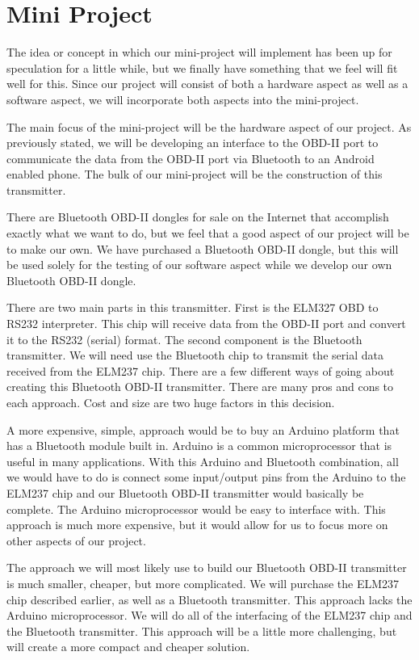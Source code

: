 \documentclass[12pt]{article}
\begin{document}
\section{Mini Project}\label{sec:MiniProject}

The idea or concept in which our mini-project will implement has been up for speculation for a little while, but we finally have something that we feel will fit well for this. Since our project will consist of both a hardware aspect as well as a software aspect, we will incorporate both aspects into the mini-project.

The main focus of the mini-project will be the hardware aspect of our project. As previously stated, we will be developing an interface to the OBD-II port to communicate the data from the OBD-II port via Bluetooth to an Android enabled phone. The bulk of our mini-project will be the construction of this transmitter.

There are Bluetooth OBD-II dongles for sale on the Internet that accomplish exactly what we want to do, but we feel that a good aspect of our project will be to make our own. We have purchased a Bluetooth OBD-II dongle, but this will be used solely for the testing of our software aspect while we develop our own Bluetooth OBD-II dongle.

There are two main parts in this transmitter. First is the ELM327 OBD to RS232 interpreter. This chip will receive data from the OBD-II port and convert it to the RS232 (serial) format. The second component is the Bluetooth transmitter. We will need use the Bluetooth chip to transmit the serial data received from the ELM237 chip. There are a few different ways of going about creating this Bluetooth OBD-II transmitter. There are many pros and cons to each approach. Cost and size are two huge factors in this decision.

A more expensive, simple, approach would be to buy an Arduino platform that has a Bluetooth module built in. Arduino is a common microprocessor that is useful in many applications. With this Arduino and Bluetooth combination, all we would have to do is connect some input/output pins from the Arduino to the ELM237 chip and our Bluetooth OBD-II transmitter would basically be complete. The Arduino microprocessor would be easy to interface with. This approach is much more expensive, but it would allow for us to focus more on other aspects of our project.

The approach we will most likely use to build our Bluetooth OBD-II transmitter is much smaller, cheaper, but more complicated. We will purchase the ELM237 chip described earlier, as well as a Bluetooth transmitter. This approach lacks the Arduino microprocessor. We will do all of the interfacing of the ELM237 chip and the Bluetooth transmitter. This approach will be a little more challenging, but will create a more compact and cheaper solution.
\end{document}
